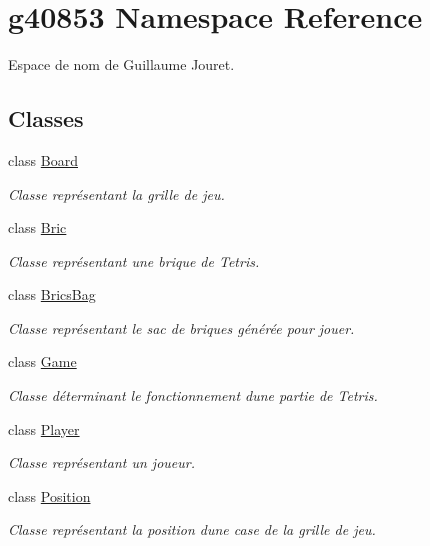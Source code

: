 \hypertarget{namespaceg40853}{}\section{g40853 Namespace Reference}
\label{namespaceg40853}


Espace de nom de Guillaume Jouret.  


\subsection*{Classes}
\begin{DoxyCompactItemize}
\item 
class \hyperlink{classg40853_1_1_board}{Board}
\begin{DoxyCompactList}\small\item\em Classe représentant la grille de jeu. \end{DoxyCompactList}\item 
class \hyperlink{classg40853_1_1_bric}{Bric}
\begin{DoxyCompactList}\small\item\em Classe représentant une brique de Tetris. \end{DoxyCompactList}\item 
class \hyperlink{classg40853_1_1_brics_bag}{Brics\+Bag}
\begin{DoxyCompactList}\small\item\em Classe représentant le sac de briques générée pour jouer. \end{DoxyCompactList}\item 
class \hyperlink{classg40853_1_1_game}{Game}
\begin{DoxyCompactList}\small\item\em Classe déterminant le fonctionnement d\textquotesingle{}une partie de Tetris. \end{DoxyCompactList}\item 
class \hyperlink{classg40853_1_1_player}{Player}
\begin{DoxyCompactList}\small\item\em Classe représentant un joueur. \end{DoxyCompactList}\item 
class \hyperlink{classg40853_1_1_position}{Position}
\begin{DoxyCompactList}\small\item\em Classe représentant la position d\textquotesingle{}une case de la grille de jeu. \end{DoxyCompactList}\end{DoxyCompactItemize}
